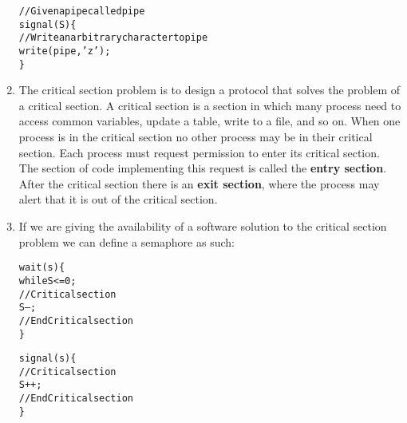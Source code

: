\documentclass{article}
\begin{document}
\begin{enumerate}
  \begin{alltt}
    // Given a pipe called pipe
    signal(S) \{
      // Write an arbitrary character to pipe
      write(pipe,'z');
    \}
  \end{alltt}
\item The critical section problem is to design a protocol that solves the problem of a critical section. A critical section is a section in which many process need to access common variables, update a table, write to a file, and so on. When one process is in the critical section no other process may be in their critical section. Each process must request permission to enter its critical section. The section of code implementing this request is called the \textbf{entry section}. After the critical section there is an \textbf{exit section}, where the process may alert that it is out of the critical section.
\item If we are giving the availability of a software solution to the critical section problem we can define a semaphore as such:
\begin{alltt}
  wait(s) \{
    while S <= 0;
    // Critical section
    S--;
    // End Critical section
  \}

  signal(s) \{
    // Critical section
    S++;
    // End Critical section
  \}
\end{alltt}


\end{enumerate}
\end{document}
